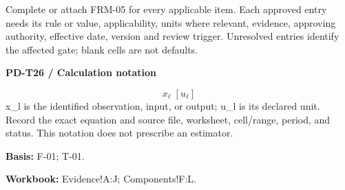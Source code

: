 \begin{Notice}Complete or attach FRM-05 for every applicable item. Each approved entry needs its rule or value, applicability, units where relevant, evidence, approving authority, effective date, version and review trigger. Unresolved entries identify the affected gate; blank cells are not defaults.\end{Notice}
\par\begingroup\sffamily\fontsize{8}{10}\selectfont\color{NEBGreen}\setlength{\parskip}{2pt}\setlength{\abovedisplayskip}{4pt}\setlength{\belowdisplayskip}{4pt}\setlength{\abovedisplayshortskip}{2pt}\setlength{\belowdisplayshortskip}{3pt}
\textbf{PD-T26 / Calculation notation}\par
{\fontsize{9}{11}\selectfont\[ x_{\ell}\;[u_{\ell}] \]}
x\_l is the identified observation, input, or output; u\_l is its declared unit. Record the exact equation and source file, worksheet, cell/range, period, and status. This notation does not prescribe an estimator.\par
\textbf{Basis:} F-01; T-01.\par
\textbf{Workbook:} Evidence!A:J; Components!F:L.\par\endgroup
